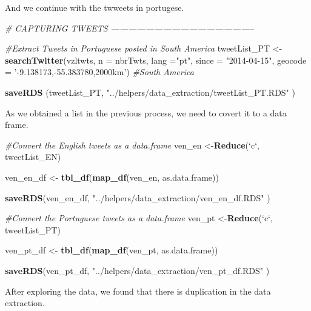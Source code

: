 \documentclass[]{article}
\newenvironment{Shaded}{\begin{snugshade}}{\end{snugshade}}
\newcommand{\KeywordTok}[1]{\textcolor[rgb]{0.13,0.29,0.53}{\textbf{{#1}}}}
\newcommand{\DataTypeTok}[1]{\textcolor[rgb]{0.13,0.29,0.53}{{#1}}}
\newcommand{\StringTok}[1]{\textcolor[rgb]{0.31,0.60,0.02}{{#1}}}
\newcommand{\CommentTok}[1]{\textcolor[rgb]{0.56,0.35,0.01}{\textit{{#1}}}}
\newcommand{\NormalTok}[1]{{#1}}
\begin{document}
And we continue with the twweets in portugese.

\begin{Shaded}
\begin{Highlighting}[]
\CommentTok{# CAPTURING TWEETS --------------------------------------------------}

\CommentTok{#Extract Tweets in Portuguese posted in South America}
\NormalTok{tweetList_PT <-}\StringTok{ }\KeywordTok{searchTwitter}\NormalTok{(vzltwts,}
                \DataTypeTok{n =} \NormalTok{nbrTwts,}
                \DataTypeTok{lang =}\StringTok{"pt"}\NormalTok{,}
                \DataTypeTok{since =} \StringTok{"2014-04-15"}\NormalTok{,}
                \DataTypeTok{geocode =} \StringTok{'-9.138173,-55.383780,2000km'}\NormalTok{) }\CommentTok{#South America}
  

\KeywordTok{saveRDS} \NormalTok{(tweetList_PT, }\StringTok{"../helpers/data_extraction/tweetList_PT.RDS"} \NormalTok{)}
\end{Highlighting}
\end{Shaded}

As we obtained a list in the previous process, we need to covert it to a
data frame.

\begin{Shaded}
\begin{Highlighting}[]
\CommentTok{#Convert the English tweets as a data.frame}
\NormalTok{ven_en <-}\KeywordTok{Reduce}\NormalTok{(}\StringTok{`}\DataTypeTok{c}\StringTok{`}\NormalTok{, tweetList_EN)}

\NormalTok{ven_en_df <-}\StringTok{ }\KeywordTok{tbl_df}\NormalTok{(}\KeywordTok{map_df}\NormalTok{(ven_en, as.data.frame))}

\KeywordTok{saveRDS}\NormalTok{(ven_en_df, }\StringTok{"../helpers/data_extraction/ven_en_df.RDS"} \NormalTok{)}


\CommentTok{#Convert the Portuguese tweets as a data.frame}
\NormalTok{ven_pt <-}\KeywordTok{Reduce}\NormalTok{(}\StringTok{`}\DataTypeTok{c}\StringTok{`}\NormalTok{, tweetList_PT)}

\NormalTok{ven_pt_df <-}\StringTok{ }\KeywordTok{tbl_df}\NormalTok{(}\KeywordTok{map_df}\NormalTok{(ven_pt, as.data.frame))}

\KeywordTok{saveRDS}\NormalTok{(ven_pt_df, }\StringTok{"../helpers/data_extraction/ven_pt_df.RDS"} \NormalTok{)}
\end{Highlighting}
\end{Shaded}

After exploring the data, we found that there is duplication in the data
extraction.
\end{document}
